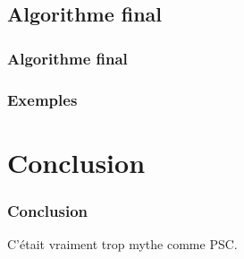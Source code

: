 \documentclass[12pt]{beamer}
\begin{document}
\subsection{Algorithme final}

\begin{frame}
 \frametitle{Algorithme final}
 
 
\end{frame}

\begin{frame}
 \frametitle{Exemples}
 
 
\end{frame}

\section{Conclusion}

\begin{frame}
 \frametitle{Conclusion}
 
C'était vraiment trop mythe comme PSC.
 
\end{frame}
\end{document}
